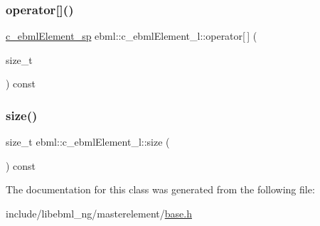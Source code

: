 \mbox{\label{classebml_1_1c__ebmlElement__l_a96efd97da3095d4041f055415ab9ae6b}} 
\subsubsection{\texorpdfstring{operator[]()}{operator[]()}}
{\footnotesize\ttfamily \mbox{\hyperlink{namespaceebml_a2deef4e8071531b32e3533f1bf978917}{c\+\_\+ebml\+Element\+\_\+sp}} ebml\+::c\+\_\+ebml\+Element\+\_\+l\+::operator\mbox{[}$\,$\mbox{]} (\begin{DoxyParamCaption}\item[{size\+\_\+t}]{ }\end{DoxyParamCaption}) const}

\mbox{\label{classebml_1_1c__ebmlElement__l_adc228d5daa606faf08cb29feedee3d33}} 
\subsubsection{\texorpdfstring{size()}{size()}}
{\footnotesize\ttfamily size\+\_\+t ebml\+::c\+\_\+ebml\+Element\+\_\+l\+::size (\begin{DoxyParamCaption}{ }\end{DoxyParamCaption}) const}



The documentation for this class was generated from the following file\+:\begin{DoxyCompactItemize}
\item 
include/libebml\+\_\+ng/masterelement/\mbox{\hyperlink{masterelement_2base_8h}{base.\+h}}\end{DoxyCompactItemize}

